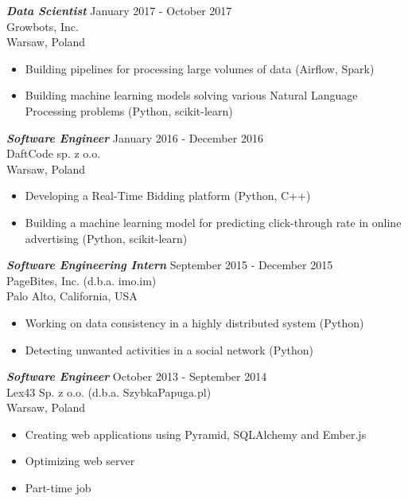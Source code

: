 \documentclass[margin, 10pt]{res} %
\begin{document}
\begin{resume}
{\sl \bf Data Scientist} \hfill January 2017 - October 2017 \\
Growbots, Inc. \\
Warsaw, Poland

\begin{itemize} \itemsep -2pt %
\item Building pipelines for processing large volumes of data (Airflow, Spark)
\item Building machine learning models solving various Natural Language Processing problems (Python, scikit-learn)
\end{itemize}

{\sl \bf Software Engineer} \hfill January 2016 - December 2016 \\
DaftCode sp. z o.o. \\
Warsaw, Poland

\begin{itemize} \itemsep -2pt %
\item Developing a Real-Time Bidding platform (Python, C++)
\item Building a machine learning model for predicting click-through rate in online advertising (Python, scikit-learn)
\end{itemize}

{\sl \bf Software Engineering Intern} \hfill September 2015 - December 2015 \\
PageBites, Inc. (d.b.a. imo.im) \\
Palo Alto, California, USA

\begin{itemize} \itemsep -2pt %
\item Working on data consistency in a highly distributed system (Python)
\item Detecting unwanted activities in a social network (Python)
\end{itemize}


{\sl \bf Software Engineer} \hfill October 2013 - September 2014 \\
Lex43 Sp. z o.o. (d.b.a. SzybkaPapuga.pl) \\
Warsaw, Poland

\begin{itemize} \itemsep -2pt %
\item Creating web applications using Pyramid, SQLAlchemy and Ember.js
\item Optimizing web server
\item Part-time job
\end{itemize}
 

\end{resume}
\end{document}
